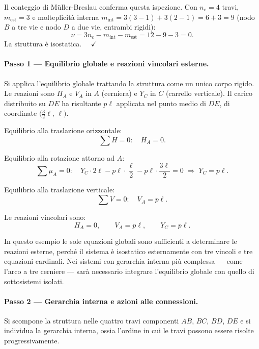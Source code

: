 Il conteggio di Müller-Breslau conferma questa
ispezione. Con $n_e = 4$ travi, $m_\text{est} = 3$
e molteplicità interna $m_\text{int} = 3(3-1) +
3(2-1) = 6 + 3 = 9$ (nodo $B$ a tre vie e nodo
$D$ a due vie, entrambi rigidi):
\[
\nu = 3n_e - m_\text{int} - m_\text{est}
= 12 - 9 - 3 = 0.
\]
La struttura è isostatica. $\quad\checkmark$


\paragraph{Passo 1 --- Equilibrio globale e
	reazioni vincolari esterne.}

Si applica l'equilibrio globale trattando la
struttura come un unico corpo rigido.
Le reazioni sono $H_A$ e $V_A$ in $A$
(cerniera) e $Y_C$ in $C$ (carrello verticale).
Il carico distribuito su $DE$ ha risultante
$p\ell$ applicata nel punto medio di $DE$,
di coordinate $\bigl(\tfrac{3}{2}\ell,\,\ell\bigr)$.

\noindent Equilibrio alla traslazione orizzontale:
\[
\sum H = 0:\quad H_A = 0.
\]

\noindent Equilibrio alla rotazione attorno ad $A$:
\[
\sum \mu_A = 0:\quad
Y_C \cdot 2\ell
- p\ell \cdot \frac{\ell}{2}
- p\ell \cdot \frac{3\ell}{2} = 0
\;\Rightarrow\;
Y_C = p\ell.
\]

\noindent Equilibrio alla traslazione verticale:
\[
\sum V = 0:\quad
V_A = p\ell.
\]

Le reazioni vincolari sono:
\[
H_A = 0, \qquad V_A = p\ell, \qquad Y_C = p\ell.
\]

In questo esempio le sole equazioni globali
sono sufficienti a determinare le reazioni
esterne, perché il sistema è isostatico
esternamente con tre vincoli e tre equazioni
cardinali. Nei sistemi con gerarchia interna
più complessa --- come l'arco a tre cerniere
--- sarà necessario integrare l'equilibrio
globale con quello di sottosistemi isolati.

\paragraph{Passo 2 --- Gerarchia interna e azioni
	alle connessioni.}

Si scompone la struttura nelle quattro travi
componenti $AB$, $BC$, $BD$, $DE$ e si
individua la gerarchia interna, ossia l'ordine
in cui le travi possono essere risolte
progressivamente.

